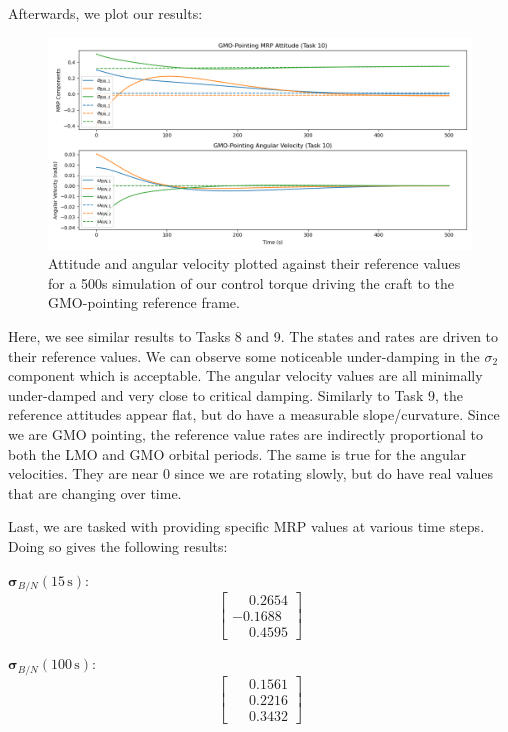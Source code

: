 \documentclass[conf]{new-aiaa}
\begin{document}
Afterwards, we plot our results:
\begin{figure}[H]
    \centering
    \captionsetup{width=.7\linewidth}
    \includegraphics[width=1\linewidth]{task10_gmo_pointing_control.png}
    \caption{Attitude and angular velocity plotted against their reference values for a 500s simulation of our control torque driving the craft to the GMO-pointing reference frame.}
    \label{fig:enter-label}
\end{figure}
Here, we see similar results to Tasks 8 and 9. The states and rates are driven to their reference values. We can observe some noticeable under-damping in the $\sigma_2$ component which is acceptable. The angular velocity values are all minimally under-damped and very close to critical damping. Similarly to Task 9, the reference attitudes appear flat, but do have a measurable slope/curvature. Since we are GMO pointing, the reference value rates are indirectly proportional to both the LMO and GMO orbital periods. The same is true for the angular velocities. They are near 0 since we are rotating slowly, but do have real values that are changing over time.

Last, we are tasked with providing specific MRP values at various time steps. Doing so gives the following results:

$\bm{\sigma}_{B/N}(15\,\text{s})$:
\[
\begin{bmatrix}
\phantom{-}0.2654 \\
-0.1688 \\
\phantom{-}0.4595
\end{bmatrix}
\]

$\bm{\sigma}_{B/N}(100\,\text{s})$:
\[
\begin{bmatrix}
\phantom{-}0.1561 \\
\phantom{-}0.2216 \\
\phantom{-}0.3432
\end{bmatrix}
\]
\end{document}
